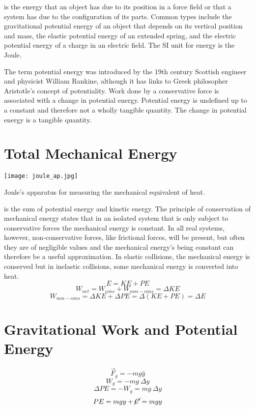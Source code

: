  is the energy that an object has due to its position in a force field or that a system has due to the configuration of its parts.  Common types include the gravitational potential energy of an object that depends on its vertical position and mass, the elastic potential energy of an extended spring, and the electric potential energy of a charge in an electric field. The SI unit for energy is the Joule.

The term potential energy was introduced by the 19th century Scottish engineer and physicist William Rankine, although it has links to Greek philosopher Aristotle's concept of potentiality.  Work done by a conservative force is associated with a change in potential energy.  Potential energy is undefined up to a constant and therefore not a wholly tangible quantity.  The change in potential energy is a tangible quantity.



\section{Total Mechanical Energy}
\begin{marginfigure}[10pt]%
  \texttt{[image: joule\_ap.jpg]}
  \caption{Joule's apparatus for measuring the mechanical equivalent of heat.}
  \label{fig:marginfig}
\end{marginfigure}
 is the sum of potential energy and kinetic energy.  The principle of conservation of mechanical energy states that in an isolated system that is only subject to conservative forces the mechanical energy is constant.  In all real systems, however, non-conservative forces, like frictional forces, will be present, but often they are of negligible values and the mechanical energy's being constant can therefore be a useful approximation. In elastic collisions, the mechanical energy is conserved but in inelastic collisions, some mechanical energy is converted into heat. 
$$E=KE+PE$$
$$W_{net}=W_{cons}+W_{non-cons}=\Delta KE$$
$$W_{non-cons}=\Delta{KE}+\Delta{PE}=\Delta(KE+PE)=\Delta{E}$$



\section{Gravitational Work and Potential Energy}
$$\overrightarrow{F}_g=-mg\hat{y}$$
$$W_g=-mg\ \Delta y$$
$$\Delta PE=-W_g=mg\ \Delta y$$
$$PE=mgy+\cancel{C}=mgy$$

